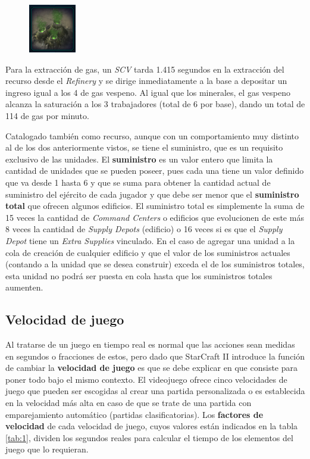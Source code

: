 \begin{figure}[H]
	\centering
	\captionsetup{justification=centering}
	\includegraphics[keepaspectratio]{images/gas.png}
	\label{fig:4}
\end{figure}

Para la extracción de gas, un \textit{SCV} tarda 1.415 segundos en la extracción del recurso desde el \textit{Refinery} y se dirige inmediatamente a la base a depositar un ingreso igual a los 4 de gas vespeno. Al igual que los minerales, el gas vespeno alcanza la saturación a los 3 trabajadores (total de 6 por base), dando un total de 114 de gas por minuto.

Catalogado también como recurso, aunque con un comportamiento muy distinto al de los dos anteriormente vistos, se tiene el suministro, que es un requisito exclusivo de las unidades. El \textbf{suministro} es un valor entero que limita la cantidad de unidades que se pueden poseer, pues cada una tiene un valor definido que va desde 1 hasta 6 y que se suma para obtener la cantidad actual de suministro del ejército de cada jugador y que debe ser menor que el \textbf{suministro total} que ofrecen algunos edificios. El suministro total es simplemente la suma de 15 veces la cantidad de \textit{Command Centers} o edificios que evolucionen de este más 8 veces la cantidad de \textit{Supply Depots} (edificio) o 16 veces si es que el \textit{Supply Depot} tiene un \textit{Extra Supplies} vinculado. En el caso de agregar una unidad a la cola de creación de cualquier edificio y que el valor de los suministros actuales (contando a la unidad que se desea construir) exceda el de los suministros totales, esta unidad no podrá ser puesta en cola hasta que los suministros totales aumenten.

\subsection{Velocidad de juego}

Al tratarse de un juego en tiempo real es normal que las acciones sean medidas en segundos o fracciones de estos, pero dado que StarCraft II introduce la función de cambiar la \textbf{velocidad de juego} es que se debe explicar en que consiste para poner todo bajo el mismo contexto. El videojuego ofrece cinco velocidades de juego que pueden ser escogidas al crear una partida personalizada o es establecida en la velocidad más alta en caso de que se trate de una partida con emparejamiento automático (partidas clasificatorias). Los \textbf{factores de velocidad} de cada velocidad de juego, cuyos valores están indicados en la tabla {\ref{tab:1}}, dividen los segundos reales para calcular el tiempo de los elementos del juego que lo requieran.


